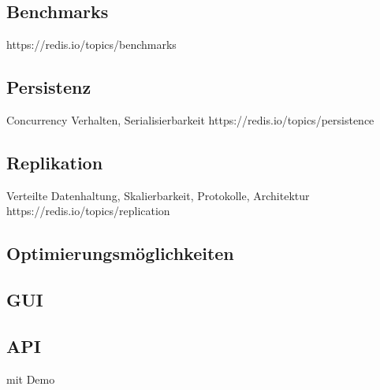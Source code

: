 \subsection{Benchmarks}
https://redis.io/topics/benchmarks
\subsection{Persistenz}
Concurrency Verhalten, Serialisierbarkeit
https://redis.io/topics/persistence
\subsection{Replikation}
Verteilte Datenhaltung, Skalierbarkeit, Protokolle, Architektur
https://redis.io/topics/replication
\subsection{Optimierungsmöglichkeiten}
\subsection{GUI}
\subsection{API}
mit Demo
